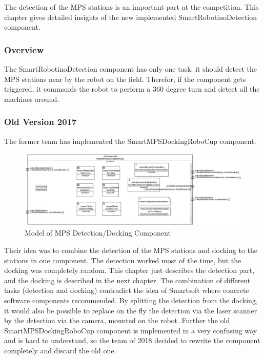 The detection of the MPS stations is an important part at the competition. This chapter gives detailed insights of the new implemented SmartRobotinoDetection component. 


\subsubsection{Overview}

The SmartRobotinoDetection component has only one task: it should detect the MPS stations near by the robot on the field. Therefor, if the component gets triggered, it commands the robot to perform a 360 degree turn and detect all the machines around.

\subsubsection{Old Version 2017}
The former team has implemented the SmartMPSDockingRoboCup component. 

\begin{figure}[h]
\centering
\includegraphics[scale=0.4]{pic/SmartMPSDockingRoboCup.jpg}
\caption{Model of MPS Detection/Docking Component}
\label{fig:dockingold_overview}
\end{figure}

Their idea was to combine the detection of the MPS stations and docking to the stations in one component. The detection worked most of the time, but the docking was completely random. This chapter just describes the detection part, and the docking is described in the next chapter. 
The combination of different tasks (detection and docking) contradict the idea of Smartsoft where concrete software components recommended. By splitting the detection from the docking, it would also be possible to replace on the fly the detection via the laser scanner by the detection via the camera, mounted on the robot.
Further the old SmartMPSDockingRoboCup component is implemented in a very confusing way and is hard to understand, so the team of 2018 decided to rewrite the component completely and discard the old one.


